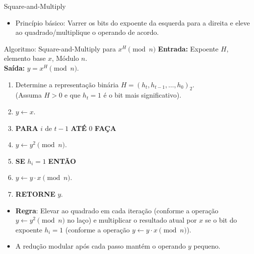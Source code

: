 \documentclass{beamer}
\begin{document}
\begin{frame}{Square-and-Multiply}
    \begin{itemize}
        \item Princípio básico: Varrer os bits do expoente da esquerda para a direita e eleve ao quadrado/multiplique o operando de acordo.
    \end{itemize}
\vspace{-0.5em}
    \begin{block}{Algoritmo: Square-and-Multiply para $x^H \pmod n$}
        \tiny
        \textbf{Entrada:} Expoente $H$, elemento base $x$, Módulo $n$. \\
        \textbf{Saída:} $y = x^H \pmod n$.
        \begin{enumerate}
            \item Determine a representação binária $H = (h_t, h_{t-1}, \dots, h_0)_2$. \\(Assuma $H > 0$ e que $h_t=1$ é o bit mais significativo).
            \item $y \leftarrow x$.
            \item \textbf{PARA} $i$ de $t-1$ \textbf{ATÉ} $0$ \textbf{FAÇA}
            \item \quad $y \leftarrow y^2 \pmod n$.
            \item \quad \textbf{SE} $h_i = 1$ \textbf{ENTÃO}
            \item \quad \quad $y \leftarrow y \cdot x \pmod n$.
            \item \textbf{RETORNE} $y$.
        \end{enumerate}
    \end{block}
\vspace{-0.5em}
    \begin{itemize}
        \item \textbf{Regra}: Elevar ao quadrado em cada iteração (conforme a operação $y \leftarrow y^2 \pmod n$ no laço) e multiplicar o resultado atual por $x$ se o bit do expoente $h_i = 1$ (conforme a operação $y \leftarrow y \cdot x \pmod n$).
        \item A redução modular após cada passo mantém o operando $y$ pequeno.
    \end{itemize}
\end{frame}
\end{document}

